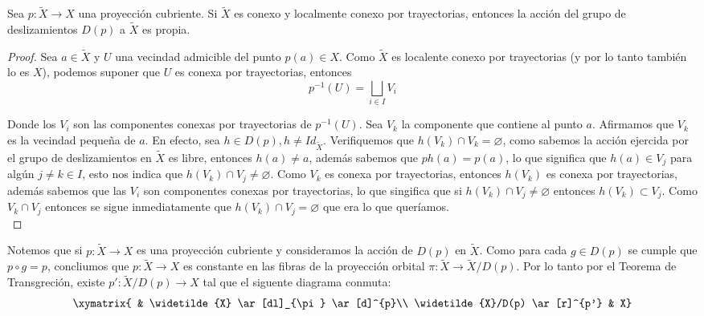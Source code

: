 \begin{theorem}
Sea $p:\widetilde{X} \rightarrow X$ una proyecci\'on cubriente. Si $\widetilde{X}$ es conexo y localmente conexo por trayectorias, entonces la acci\'on del grupo de deslizamientos $D(p)$ a $\widetilde{X}$ es propia.
\end{theorem}

\begin{proof}
Sea $a \in \widetilde{X}$ y $U$ una vecindad admicible del punto $p(a) \in X$. Como $\widetilde{X}$ es localente conexo por trayectorias (y por lo tanto tambi\'en lo es $X$), podemos suponer que $U$ es conexa por trayectorias, entonces\\ 

$$p^{-1}(U)=\bigsqcup_{i \in I}V_i$$
 
Donde los $V_i$ son las componentes conexas por trayectorias de $p^{-1}(U)$. Sea $V_k$ la componente que contiene al punto $a$. Afirmamos que $V_k$ es la vecindad peque\~na de $a$. En efecto, sea $h \in D(p), h \neq Id_{\widetilde{X}}$. Verifiquemos que $h(V_k) \cap V_k = \varnothing$, como sabemos la acci\'on ejercida por el grupo de deslizamientos en $\widetilde{X}$ es libre, entonces $h(a) \neq a$, adem\'as sabemos que $ph(a)=p(a)$, lo que significa que $h(a) \in V_j$ para alg\'un $j \neq k \in I$, esto nos indica que $h(V_k) \cap V_j \neq \varnothing$. Como $V_k$ es conexa por trayectorias, entonces $h(V_k)$ es conexa por trayectorias, adem\'as sabemos que las $V_i$ son componentes conexas por trayectorias, lo que singifica que si $h(V_k) \cap V_j \neq \varnothing$ entonces $h(V_k) \subset V_j$. Como $V_k \cap V_j$ entonces se sigue inmediatamente que $h(V_k) \cap V_j = \varnothing$ que era lo que quer\'iamos.\\  
\end{proof}

Notemos que si $p:\widetilde{X} \rightarrow X$ es una proyecci\'on cubriente y consideramos la acci\'on de $D(p)$ en $\widetilde{X}$. Como para cada $g \in D(p)$ se cumple que $p \circ g=p$, concliumos que $p:\widetilde{X} \rightarrow X$ es constante en las fibras de la proyecci\'on orbital $\pi:\widetilde{X} \rightarrow \widetilde{X}/D(p)$. Por lo tanto por el Teorema de Transgreci\'on, existe $p':\widetilde{X}/D(p) \rightarrow X$ tal que el siguente diagrama conmuta:\\

$$ \xymatrix{    & \widetilde{X} \ar[dl]_{\pi} \ar[d]^{p}\\
             \widetilde{X}/D(p) \ar[r]^{p'} & X} $$

